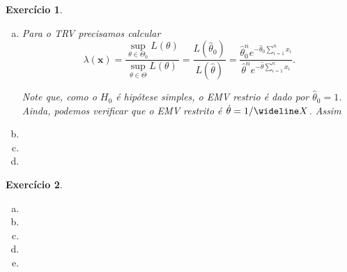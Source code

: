 \documentclass[letter,11pt]{article}
\newtheorem{exer}{Exercício}
\begin{document}
\begin{exer} \rm

\begin{enumerate}[a)]

\item %
Para o TRV precisamos calcular
$$ \lambda(\boldsymbol{x}) = \frac{\sup_{\theta \in \Theta_0} L(\theta)}{\sup_{\theta \in \Theta} L(\theta)} = \frac{L(\hat \theta_0)}{L(\hat \theta)}  = \frac{\hat \theta_0^n e^{- \hat \theta_0 \sum_{i=1}^n x_i}}{\hat \theta^n e^{- \hat \theta \sum_{i=1}^n x_i}}.$$

Note que, como o $H_0$ é hipótese simples, o EMV restrio é dado por $\hat \theta_0 = 1$. Ainda, podemos verificar que o EMV restrito é $\hat \theta = 1/ \wideline X$. Assim
\item %

\item %

\item %

\end{enumerate}
\end{exer}


\begin{exer} \rm
  \begin{enumerate}[a)]
    \item %

    \item %

    \item %
  
    \item %

    \item %
\end{enumerate}
\end{exer}
\end{document}
